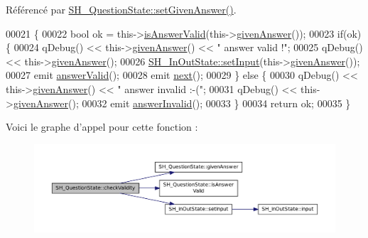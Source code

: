 Référencé par \hyperlink{classSH__QuestionState_a9d285a34a7002fd05a7fa8ff9139c264}{S\-H\-\_\-\-Question\-State\-::set\-Given\-Answer()}.


\begin{DoxyCode}
00021 \{
00022     \textcolor{keywordtype}{bool} ok = this->\hyperlink{classSH__QuestionState_ac195d7ad87a52ab276a7c4a902eab691}{isAnswerValid}(this->\hyperlink{classSH__QuestionState_abde97c61175be95358ece622fd16593e}{givenAnswer}());
00023     \textcolor{keywordflow}{if}(ok) \{
00024         qDebug() << this->\hyperlink{classSH__QuestionState_abde97c61175be95358ece622fd16593e}{givenAnswer}() << \textcolor{stringliteral}{" answer valid !"};
00025         qDebug() << this->\hyperlink{classSH__QuestionState_abde97c61175be95358ece622fd16593e}{givenAnswer}();
00026         \hyperlink{classSH__InOutState_a0206ab7d5616f28b0da7bfd5451614e8}{SH\_InOutState::setInput}(this->\hyperlink{classSH__QuestionState_abde97c61175be95358ece622fd16593e}{givenAnswer}());
00027         emit \hyperlink{classSH__QuestionState_a04e259643788d15ab6244bc8a04286d6}{answerValid}();
00028         emit \hyperlink{classSH__GenericState_a030e67a872956135c52e6876d960a7b5}{next}();
00029     \} \textcolor{keywordflow}{else} \{
00030         qDebug() << this->\hyperlink{classSH__QuestionState_abde97c61175be95358ece622fd16593e}{givenAnswer}() << \textcolor{stringliteral}{" answer invalid :-("};
00031         qDebug() << this->\hyperlink{classSH__QuestionState_abde97c61175be95358ece622fd16593e}{givenAnswer}();
00032         emit \hyperlink{classSH__QuestionState_a3348a8a683130678ac87a10ba2a25486}{answerInvalid}();
00033     \}
00034     \textcolor{keywordflow}{return} ok;
00035 \}
\end{DoxyCode}


Voici le graphe d'appel pour cette fonction \-:\nopagebreak
\begin{figure}[H]
\begin{center}
\leavevmode
\includegraphics[width=350pt]{classSH__QuestionState_a3ca5459c20ef591023c0572d8224146c_cgraph}
\end{center}
\end{figure}




